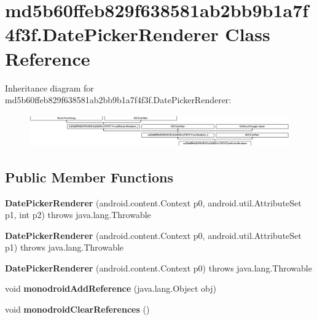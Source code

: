 \hypertarget{classmd5b60ffeb829f638581ab2bb9b1a7f4f3f_1_1DatePickerRenderer}{}\section{md5b60ffeb829f638581ab2bb9b1a7f4f3f.\+Date\+Picker\+Renderer Class Reference}
\label{classmd5b60ffeb829f638581ab2bb9b1a7f4f3f_1_1DatePickerRenderer}
Inheritance diagram for md5b60ffeb829f638581ab2bb9b1a7f4f3f.\+Date\+Picker\+Renderer\+:\begin{figure}[H]
\begin{center}
\leavevmode
\includegraphics[height=1.403509cm]{classmd5b60ffeb829f638581ab2bb9b1a7f4f3f_1_1DatePickerRenderer}
\end{center}
\end{figure}
\subsection*{Public Member Functions}
\begin{DoxyCompactItemize}
\item 
\mbox{\label{classmd5b60ffeb829f638581ab2bb9b1a7f4f3f_1_1DatePickerRenderer_a9c9f3897fd07153d0786f2c0cd7f9137}} 
{\bfseries Date\+Picker\+Renderer} (android.\+content.\+Context p0, android.\+util.\+Attribute\+Set p1, int p2)  throws java.\+lang.\+Throwable 	
\item 
\mbox{\label{classmd5b60ffeb829f638581ab2bb9b1a7f4f3f_1_1DatePickerRenderer_ade65698654faac1638d89be69a76bf07}} 
{\bfseries Date\+Picker\+Renderer} (android.\+content.\+Context p0, android.\+util.\+Attribute\+Set p1)  throws java.\+lang.\+Throwable 	
\item 
\mbox{\label{classmd5b60ffeb829f638581ab2bb9b1a7f4f3f_1_1DatePickerRenderer_ae5cb2d0f611ae56a000a816dff6a4b6d}} 
{\bfseries Date\+Picker\+Renderer} (android.\+content.\+Context p0)  throws java.\+lang.\+Throwable 	
\item 
\mbox{\label{classmd5b60ffeb829f638581ab2bb9b1a7f4f3f_1_1DatePickerRenderer_a3beb2afa3ed98862669dcc1fe7d6307c}} 
void {\bfseries monodroid\+Add\+Reference} (java.\+lang.\+Object obj)
\item 
\mbox{\label{classmd5b60ffeb829f638581ab2bb9b1a7f4f3f_1_1DatePickerRenderer_a272024ba18637be81cb9cd68055ccc07}} 
void {\bfseries monodroid\+Clear\+References} ()
\end{DoxyCompactItemize}
